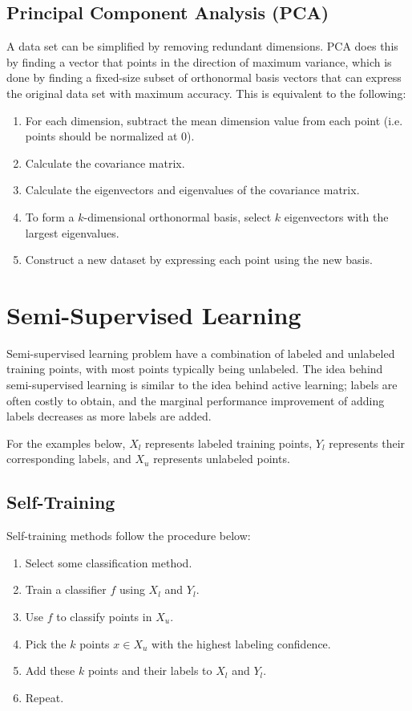 \documentclass[12pt,titlepage]{article}
\let\stdsection\section
\renewcommand\section{\clearpage\stdsection}
\begin{document}
    \subsection{Principal Component Analysis (PCA)}
      A data set can be simplified by removing redundant dimensions. PCA does this by finding a vector that points in the direction of maximum
      variance, which is done by finding a fixed-size subset of orthonormal basis vectors that can express the original data set with maximum
      accuracy. This is equivalent to the following:

      \begin{enumerate}
        \item For each dimension, subtract the mean dimension value from each point (i.e. points should be normalized at 0).
        \item Calculate the covariance matrix.
        \item Calculate the eigenvectors and eigenvalues of the covariance matrix.
        \item To form a $k$-dimensional orthonormal basis, select $k$ eigenvectors with the largest eigenvalues.
        \item Construct a new dataset by expressing each point using the new basis.
      \end{enumerate}

  \section{Semi-Supervised Learning}
    Semi-supervised learning problem have a combination of labeled and unlabeled training points, with most points typically being unlabeled.
    The idea behind semi-supervised learning is similar to the idea behind active learning; labels are often costly to obtain, and the marginal
    performance improvement of adding labels decreases as more labels are added.

    For the examples below, $X_l$ represents labeled training points, $Y_l$ represents their corresponding labels, and $X_u$ represents unlabeled
    points.

    \subsection{Self-Training}
      Self-training methods follow the procedure below:

      \begin{enumerate}
        \item Select some classification method.
        \item Train a classifier $f$ using $X_l$ and $Y_l$.
        \item Use $f$ to classify points in $X_u$.
        \item Pick the $k$ points $x \in X_u$ with the highest labeling confidence.
        \item Add these $k$ points and their labels to $X_l$ and $Y_l$.
        \item Repeat.
      \end{enumerate}
\end{document}
